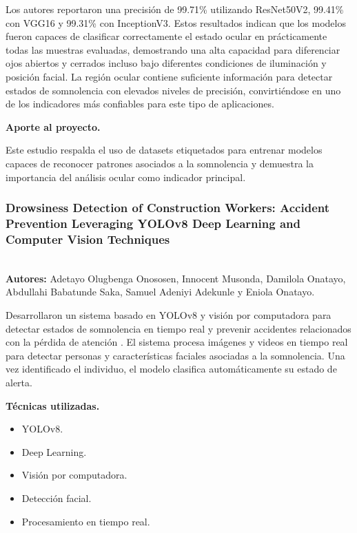 \documentclass[conference]{IEEEtran}
\begin{document}
Los autores reportaron una precisión de 99.71\% utilizando ResNet50V2, 99.41\% con VGG16 y 99.31\% con InceptionV3. Estos resultados indican que los modelos fueron capaces de clasificar correctamente el estado ocular en prácticamente todas las muestras evaluadas, demostrando una alta capacidad para diferenciar ojos abiertos y cerrados incluso bajo diferentes condiciones de iluminación y posición facial.
La región ocular contiene suficiente información para detectar estados de somnolencia con elevados niveles de precisión, convirtiéndose en uno de los indicadores más confiables para este tipo de aplicaciones.

\textbf{Aporte al proyecto.}

Este estudio respalda el uso de datasets etiquetados para entrenar modelos capaces de reconocer patrones asociados a la somnolencia y demuestra la importancia del análisis ocular como indicador principal.\\


\subsubsection{\textbf{Drowsiness Detection of Construction Workers: Accident Prevention Leveraging YOLOv8 Deep Learning and Computer Vision Techniques}} \mbox{}\\

\textbf{Autores:} Adetayo Olugbenga Onososen, Innocent Musonda, Damilola Onatayo, Abdullahi Babatunde Saka, Samuel Adeniyi Adekunle y Eniola Onatayo.

Desarrollaron un sistema basado en YOLOv8 y visión por computadora para detectar estados de somnolencia en tiempo real y prevenir accidentes relacionados con la pérdida de atención \parencite{onososen2025}.
El sistema procesa imágenes y videos en tiempo real para detectar personas y características faciales asociadas a la somnolencia. Una vez identificado el individuo, el modelo clasifica automáticamente su estado de alerta.

\textbf{Técnicas utilizadas.}

\begin{itemize}
\item YOLOv8.
\item Deep Learning.
\item Visión por computadora.
\item Detección facial.
\item Procesamiento en tiempo real.
\end{itemize}
\end{document}

